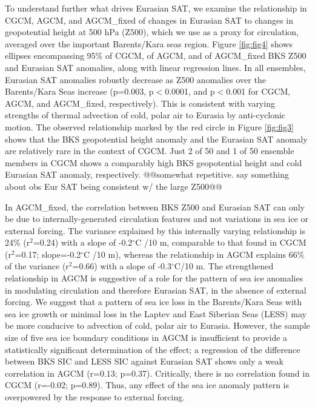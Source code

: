 \documentclass{nature}
\begin{document}

To understand further what drives Eurasian SAT, we examine the relationship in CGCM, AGCM, and AGCM\_fixed of changes in Eurasian SAT to changes in geopotential height at 500 hPa (Z500), which we use as a proxy for circulation, averaged over the important Barents/Kara seas region. Figure \ref{fig:fig4} shows ellipses encompassing 95\% of CGCM, of AGCM, and of AGCM\_fixed BKS Z500 and Eurasian SAT anomalies, along with linear regression lines. In all ensembles, Eurasian SAT anomalies robustly decrease as Z500 anomalies over the Barents/Kara Seas increase (p=0.003, p$<$0.0001, and p$<$0.001 for CGCM, AGCM, and AGCM\_fixed, respectively). This is consistent with varying strengths of thermal advection of cold, polar air to Eurasia by anti-cyclonic motion. The observed relationship marked by the red circle in Figure \ref{fig:fig3} shows that the BKS geopotential height anomaly and the Eurasian SAT anomaly are relatively rare in the context of CGCM. Just 2 of 50 and 1 of 50 ensemble members in CGCM shows a comparably high BKS geopotential height and cold Eurasian SAT anomaly, respectively. @@somewhat repetitive. say something about obs Eur SAT being consistent w/ the large Z500@@

In AGCM\_fixed, the correlation between BKS Z500 and Eurasian SAT can only be due to internally-generated circulation features and not variations in sea ice or external forcing. The variance explained by this internally varying relationship is 24\% (r$^2$=0.24) with a slope of -0.2$^\circ$C /10 m, comparable to that found in CGCM (r$^2$=0.17; slope=-0.2$^\circ$C /10 m), whereas the relationship in AGCM explains 66\% of the variance (r$^2$=0.66) with a slope of -0.3$^\circ$C/10 m. The strengthened relationship in AGCM is suggestive of a role for the pattern of sea ice anomalies in modulating circulation and therefore Eurasian SAT, in the absence of external forcing. We suggest that a pattern of sea ice loss in the Barents/Kara Seas with sea ice growth or minimal loss in the Laptev and East Siberian Seas (LESS) may be more conducive to advection of cold, polar air to Eurasia. However, the sample size of five sea ice boundary conditions in AGCM is insufficient to provide a statistically significant determination of the effect; a regression of the difference between BKS SIC and LESS SIC against Eurasian SAT shows only a weak correlation in AGCM (r=0.13; p=0.37). Critically, there is no correlation found in CGCM (r=-0.02; p=0.89). Thus, any effect of the sea ice anomaly pattern is overpowered by the response to external forcing.  %
\end{document}
